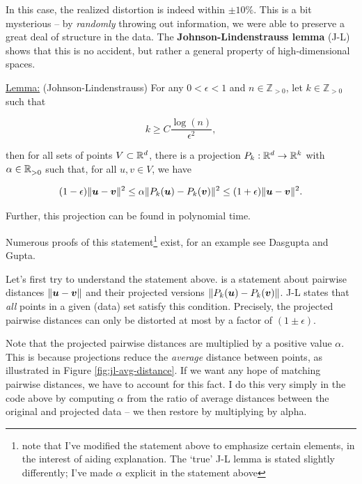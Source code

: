 \documentclass{article}
\begin{document}
In this case, the realized distortion is indeed within $\pm10\%$. This is a bit
mysterious -- by \emph{randomly} throwing out information, we were able to
preserve a great deal of structure in the data. The
\textbf{Johnson-Lindenstrauss lemma} (J-L) shows that this is no accident, but
rather a general property of high-dimensional spaces.

\bigskip
\underline{Lemma:} (Johnson-Lindenstrauss) For any $0<\epsilon<1$ and
$n\in\mathbb{Z}_{>0}$, let $k\in\mathbb{Z}_{>0}$ such that

\begin{equation} \label{eq:jl-bound}
  k \geq C \frac{\log(n)}{\epsilon^2},
\end{equation}

\noindent then for all sets of points $V\subset\mathbb{R}^{d}$, there is a projection
$P_k:\mathbb{R}^{d}\to\mathbb{R}^{k}$ with $\alpha\in\mathbb{R}^{}_{>0}$ such that, for all $u,v\in V$, we
have

\begin{equation} \label{eq:jl-distance}
  (1 - \epsilon)\|\vu - \vv\|^2 \leq \alpha\|P_k(\vu) - P_k(\vv)\|^2 \leq %
  (1 + \epsilon)\|\vu - \vv\|^2.
\end{equation}

\noindent Further, this projection can be found in polynomial time.

\bigskip
Numerous proofs of this statement\footnote{note that I've modified the statement
  above to emphasize certain elements, in the interest of aiding explanation.
  The `true' J-L lemma is stated slightly differently; I've made $\alpha$
  explicit in the statement above} exist, for an example see Dasgupta and
Gupta.\cite{dasgupta2003elementary}

Let's first try to understand the statement above.  is a
statement about pairwise distances $\|\boldsymbol{u}-\boldsymbol{v}\|$ and their projected versions
$\|P_k(\boldsymbol{u}) - P_k(\boldsymbol{v})\|$. J-L states that \emph{all} points in a given (data)
set satisfy this condition. Precisely, the projected pairwise distances can only
be distorted at most by a factor of $(1\pm\epsilon)$.

Note that the projected pairwise distances are multiplied by a positive value
$\alpha$. This is because projections reduce the \emph{average} distance between
points, as illustrated in Figure \ref{fig:jl-avg-distance}. If we want any hope
of matching pairwise distances, we have to account for this fact. I do this very
simply in the code above by computing $\alpha$ from the ratio of average
distances between the original and projected data -- we then restore by
multiplying by alpha.
\end{document}
